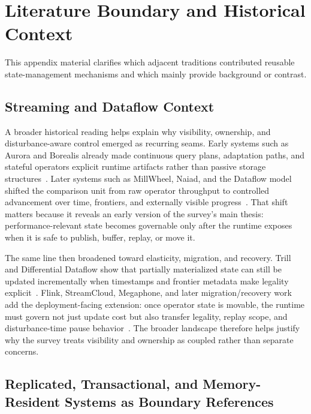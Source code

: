 \section{Literature Boundary and Historical Context}

This appendix material clarifies which adjacent traditions contributed reusable state-management mechanisms and which mainly provide background or contrast.

\subsection{Streaming and Dataflow Context}

A broader historical reading helps explain why visibility, ownership, and disturbance-aware control emerged as recurring seams. Early systems such as Aurora and Borealis already made continuous query plans, adaptation paths, and stateful operators explicit runtime artifacts rather than passive storage structures~\cite{abadi2003aurora,abadi2005borealis}. Later systems such as MillWheel, Naiad, and the Dataflow model shifted the comparison unit from raw operator throughput to controlled advancement over time, frontiers, and externally visible progress~\cite{akidau2013millwheel,murray2013naiad,akidau2015dataflow}. That shift matters because it reveals an early version of the survey's main thesis: performance-relevant state becomes governable only after the runtime exposes when it is safe to publish, buffer, replay, or move it.

The same line then broadened toward elasticity, migration, and recovery. Trill and Differential Dataflow show that partially materialized state can still be updated incrementally when timestamps and frontier metadata make legality explicit~\cite{chandramouli2014trill,murray2013differential}. Flink, StreamCloud, Megaphone, and later migration/recovery work add the deployment-facing extension: once operator state is movable, the runtime must govern not just update cost but also transfer legality, replay scope, and disturbance-time pause behavior~\cite{carbone2015flink,gulisano2012streamcloud,nasir2019megaphone,zhao2024recovery,mao2025spacker}. The broader landscape therefore helps justify why the survey treats visibility and ownership as coupled rather than separate concerns.

\subsection{Replicated, Transactional, and Memory-Resident Systems as Boundary References}


